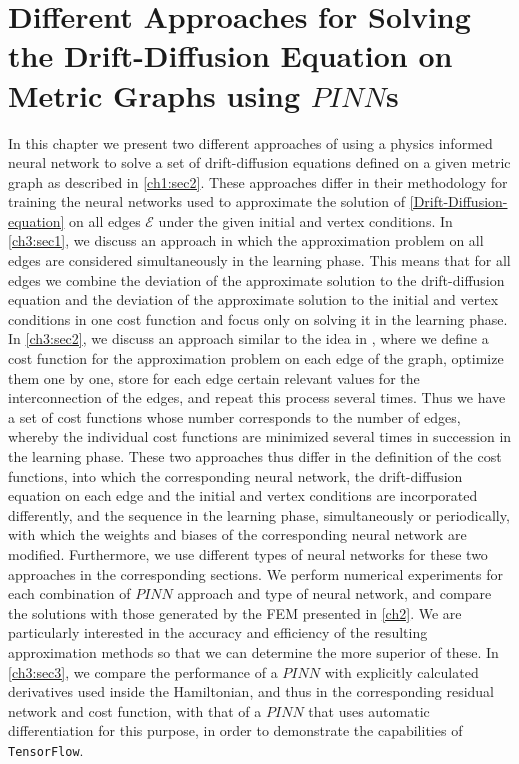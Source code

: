 \chapter{Different Approaches for Solving the Drift-Diffusion Equation on Metric Graphs using $PINN$s}

In this chapter we present two different approaches of using a physics informed neural network to solve a set of drift-diffusion equations defined on a given metric graph as described in \cref{ch1:sec2}. These approaches differ in their methodology for training the neural networks used to approximate the solution of \cref{Drift-Diffusion-equation} on all edges $\mathcal{E}$ under the given initial and vertex conditions. In \cref{ch3:sec1}, we discuss an approach in which the approximation problem on all edges are considered simultaneously in the learning phase. This means that for all edges we combine the deviation of the approximate solution to the drift-diffusion equation and the deviation of the approximate solution to the initial and vertex conditions in one cost function and focus only on solving it in the learning phase. In \cref{ch3:sec2}, we discuss an approach similar to the idea in \cite{JagtapKharazmiKarniadakis:2020}, where we define a cost function for the approximation problem on each edge of the graph, optimize them one by one, store for each edge certain relevant values for the interconnection of the edges, and repeat this process several times. Thus we have a set of cost functions whose number corresponds to the number of edges, whereby the individual cost functions are minimized several times in succession in the learning phase. These two approaches thus differ in the definition of the cost functions, into which the corresponding neural network, the drift-diffusion equation on each edge and the initial and vertex conditions are incorporated differently, and the sequence in the learning phase, simultaneously or periodically, with which the weights and biases of the corresponding neural network are modified. Furthermore, we use different types of neural networks for these two approaches in the corresponding sections. We perform numerical experiments for each combination of $PINN$ approach and type of neural network, and compare the solutions with those generated by the FEM presented in \cref{ch2}. We are particularly interested in the accuracy and efficiency of the resulting approximation methods so that we can determine the more superior of these. In \cref{ch3:sec3}, we compare the performance of a $PINN$ with explicitly calculated derivatives used inside the Hamiltonian, and thus in the corresponding residual network and cost function, with that of a $PINN$ that uses automatic differentiation for this purpose, in order to demonstrate the capabilities of \lstinline!TensorFlow!. \\


